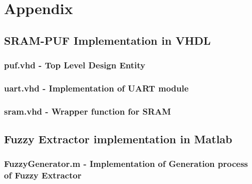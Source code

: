 
\appendix
\chapter{Appendix}

\section{SRAM-PUF Implementation in VHDL}
\label{app:srampuf}

\subsection{puf.vhd - Top Level Design Entity}
\lstset{tabsize=2}


\newpage

\subsection{uart.vhd - Implementation of UART module}



\newpage

\subsection{sram.vhd - Wrapper function for SRAM}



\newpage

\section{Fuzzy Extractor implementation in Matlab}
\label{app:fuzzy}

\subsection{FuzzyGenerator.m - Implementation of Generation process of Fuzzy Extractor}



\newpage

